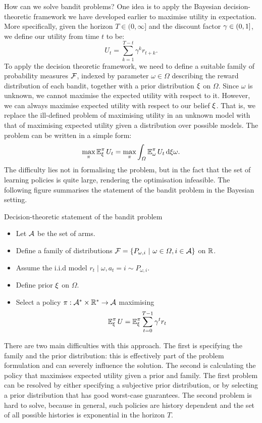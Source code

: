 How can we solve bandit problems? One idea is to apply the Bayesian
decision-theoretic framework we have developed earlier to maximise
utility in expectation.  More specifically, given the horizon $T
\in (0, \infty]$ and the discount factor $\gamma \in (0,1]$, we
define our utility from time $t$ to be:
\begin{equation}
  \label{eq:reward-utility}
  U_t = \sum_{k=1}^{T-t} \gamma^k r_{t+k}.
\end{equation}
To apply the decision theoretic framework, we need to define a suitable family of probability measures $\mathcal{F}$, indexed by parameter $\omega \in \Omega$ describing the reward distribution of each bandit, together with a prior distribution $\xi$ on $\Omega$. Since $\omega$ is unknown, we cannot maximise the expected utility with respect to it. However, we can always maximise expected utility with respect to our belief $\xi$. That is, we replace the ill-defined problem of maximising utility in an unknown model with that of maximising expected utility given a distribution over possible models. The problem can be written in a simple form:
\begin{equation}
  \label{eq:bel-reward-utility}
  \max_\pi \mathop{\mbox{\ensuremath{\mathbb{E}}}}\nolimits_\xi^\pi U_t = 
  \max_\pi \int_\Omega \mathop{\mbox{\ensuremath{\mathbb{E}}}}\nolimits_\omega^\pi U_t \,\mathrm{d} \xi{\omega}.
\end{equation}
The difficulty lies not in formalising the problem, but in the fact that the set of learning policies is quite large, rendering the optimisation infeasible.
The following figure summarises the statement of the bandit problem in the Bayesian setting.
\begin{block}{Decision-theoretic statement of the bandit problem}
  \begin{itemize}
  \item Let ${\mathcal{A}}$ be the set of arms.
  \item Define a family of distributions $\mathcal{F} = \left\{P_{\omega, i} ~\middle|~ \omega \in \Omega, i \in {\mathcal{A}}\right\}$ on ${\mathbb{R}}$.
  \item Assume the i.i.d model $r_t \mid \omega, a_t = i \sim P_{\omega, i}$.
  \item Define prior $\xi$ on $\Omega$.
  \item Select a policy $\pi : {\mathcal{A}}^* \times {\mathbb{R}}^* \to {\mathcal{A}}$ maximising
    \[
    \mathop{\mbox{\ensuremath{\mathbb{E}}}}\nolimits^\pi_\xi U = \mathop{\mbox{\ensuremath{\mathbb{E}}}}\nolimits^\pi_\xi \sum_{t=0}^{T - 1} \gamma^t r_{t}
    \]
  \end{itemize}
\end{block}
There are two main difficulties with this approach. The first is specifying the family and the prior distribution: this is effectively part of the problem formulation and can severely influence the solution. The second is calculating the policy that maximises expected utility given a prior and family. The first problem can be resolved by either specifying a subjective prior distribution, or by selecting a prior distribution that has good worst-case guarantees. The second problem is hard to solve, because in general, such policies are history dependent and the set of all possible histories is exponential in the horizon $T$.

